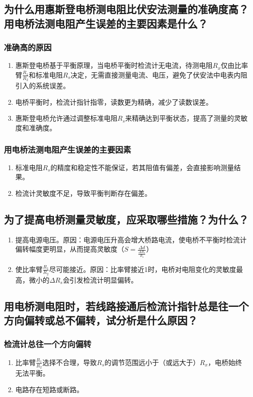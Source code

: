 \documentclass[]{../../templates/Report}%
\begin{document}
\begin{fullreportonly}
\subsection{为什么用惠斯登电桥测电阻比伏安法测量的准确度高？用电桥法测电阻产生误差的主要因素是什么？}

\subsubsection{准确高的原因}
\begin{enumerate}
   \item 惠斯登电桥基于平衡原理，当电桥平衡时检流计无电流，待测电阻\(R_x\)仅由比率臂\(\frac{R_1}{R_2}\)和标准电阻\(R_s\)决定，无需直接测量电流、电压，避免了伏安法中电表内阻引入的系统误差。
   \item 电桥平衡时，检流计指针指零，读数更为精确，减少了读数误差。
   \item 惠斯登电桥允许通过调整标准电阻\(R_s\)来精确达到平衡状态，提高了测量的灵敏度和准确度。
\end{enumerate}
\subsubsection{用电桥法测电阻产生误差的主要因素}
\begin{enumerate}
   \item 标准电阻\(R_s\)的精度和稳定性不能保证，若其阻值有偏差，会直接影响测量结果。
   \item 检流计灵敏度不足，导致平衡判断存在偏差。
\end{enumerate}
\subsection{为了提高电桥测量灵敏度，应采取哪些措施？为什么？}
\begin{enumerate}
  \item 提高电源电压。原因：电源电压升高会增大桥路电流，使电桥不平衡时检流计偏转幅度更明显，从而提高灵敏度（\(S = \frac{\Delta d}{\frac{\Delta R_s}{R_s}}\)）
  \item 使比率臂\(\frac{R_1}{R_2}\)尽可能接近。原因：比率臂接近1时，电桥对电阻变化的灵敏度最高，微小的\(\Delta R_s\)会引发检流计明显偏转。
\end{enumerate}
\subsection{用电桥测电阻时，若线路接通后检流计指针总是往一个方向偏转或总不偏转，试分析是什么原因？}
\subsubsection{检流计总往一个方向偏转}
\begin{enumerate}
   \item 比率臂\(\frac{R_1}{R_2}\)选择不合理，导致\(R_s\)的调节范围远小于（或远大于）\(R_x\)，电桥始终无法平衡。
   \item 电路存在短路或断路。
\end{enumerate}

\end{fullreportonly}
\end{document}

